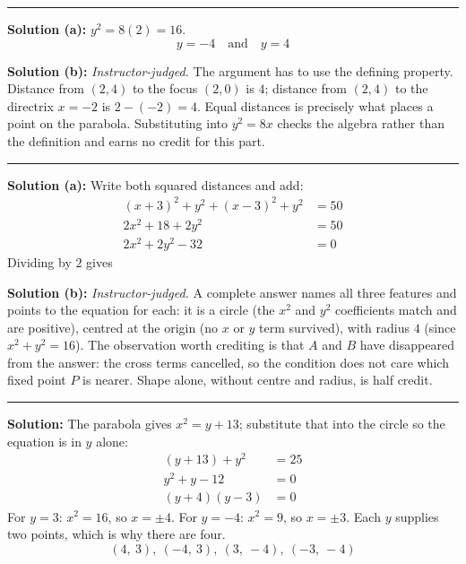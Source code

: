 \documentclass[12pt]{article}
\begin{document}
\vspace{0.1cm}\noindent\rule{\linewidth}{0.2pt}


\textbf{Solution (a):} $y^{2} = 8(2) = 16$.
\[ \boxed{y = -4 \quad \text{and} \quad y = 4} \]

\textbf{Solution (b):} \emph{Instructor-judged.} The argument has to use the defining property. Distance from $(2,4)$ to the focus $(2,0)$ is $4$; distance from $(2,4)$ to the directrix $x = -2$ is $2 - (-2) = 4$. Equal distances is precisely what places a point on the parabola. Substituting into $y^{2} = 8x$ checks the algebra rather than the definition and earns no credit for this part.

\vspace{0.1cm}\noindent\rule{\linewidth}{0.2pt}


\textbf{Solution (a):} Write both squared distances and add:
\begin{align*}
  (x+3)^{2} + y^{2} + (x-3)^{2} + y^{2} &= 50 \\
  2x^{2} + 18 + 2y^{2} &= 50 \\
  2x^{2} + 2y^{2} - 32 &= 0
\end{align*}
Dividing by $2$ gives 

\textbf{Solution (b):} \emph{Instructor-judged.} A complete answer names all three features and points to the equation for each: it is a circle (the $x^{2}$ and $y^{2}$ coefficients match and are positive), centred at the origin (no $x$ or $y$ term survived), with radius $4$ (since $x^{2} + y^{2} = 16$). The observation worth crediting is that $A$ and $B$ have disappeared from the answer: the cross terms cancelled, so the condition does not care which fixed point $P$ is nearer. Shape alone, without centre and radius, is half credit.

\vspace{0.1cm}\noindent\rule{\linewidth}{0.2pt}


\textbf{Solution:} The parabola gives $x^{2} = y + 13$; substitute that into the circle so the equation is in $y$ alone:
\begin{align*}
  (y + 13) + y^{2} &= 25 \\
  y^{2} + y - 12 &= 0 \\
  (y + 4)(y - 3) &= 0
\end{align*}
For $y = 3$: $x^{2} = 16$, so $x = \pm 4$. For $y = -4$: $x^{2} = 9$, so $x = \pm 3$. Each $y$ supplies two points, which is why there are four.
\[ \boxed{(4,\ 3),\ (-4,\ 3),\ (3,\ -4),\ (-3,\ -4)} \]
\end{document}
